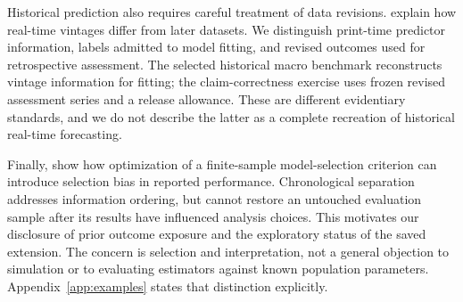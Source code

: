 Historical prediction also requires careful treatment of data revisions. \citet{croushore1999} explain how real-time vintages differ from later datasets. We distinguish print-time predictor information, labels admitted to model fitting, and revised outcomes used for retrospective assessment. The selected historical macro benchmark reconstructs vintage information for fitting; the claim-correctness exercise uses frozen revised assessment series and a release allowance. These are different evidentiary standards, and we do not describe the latter as a complete recreation of historical real-time forecasting.

Finally, \citet{cawley2010} show how optimization of a finite-sample model-selection criterion can introduce selection bias in reported performance. Chronological separation addresses information ordering, but cannot restore an untouched evaluation sample after its results have influenced analysis choices. This motivates our disclosure of prior outcome exposure and the exploratory status of the saved extension. The concern is selection and interpretation, not a general objection to simulation or to evaluating estimators against known population parameters. Appendix~\ref{app:examples} states that distinction explicitly.

